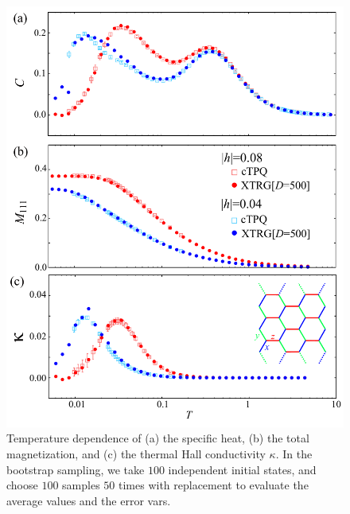\documentclass[twocolumn,superscriptaddress,showpacs, longbibliography, aps, prb]{revtex4-2}
\newcommand{\red}[1]{\textcolor{red}{#1}}
\newcommand{\orange}[1]{\textcolor{orange}{#1}}
\begin{document}
\begin{figure}[tbh] 
\begin{center} 
\includegraphics[width=0.9\linewidth]{Figs/compXTRG_3_o.pdf}
\vspace{-0.5cm} 
\caption{Temperature dependence of (a) the specific heat, (b) the total magnetization, and
(c) the thermal Hall conductivity $\kappa$. 
In the bootstrap sampling, we take $100$ independent initial states,
and choose $100$ samples $50$ times with replacement to evaluate
the average values and the error vars.
}
\label{comp_XTRG}
\end{center}
\end{figure}




\end{document}
